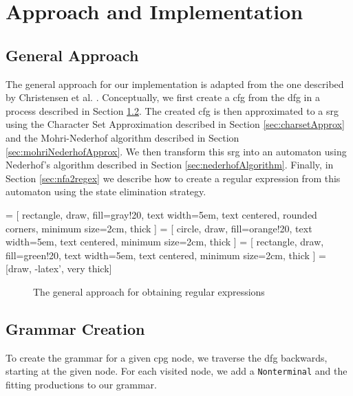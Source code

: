 \chapter{Approach and Implementation}
\label{chapter:Approach}


\section{General Approach}

The general approach for our implementation is adapted from the one described by Christensen et al. \cite{brics}. Conceptually, we first create a \acf{cfg} from the \ac{dfg} in a process described in Section \ref{sec:grammarCreation}.
The created \ac{cfg} is then approximated to a \acf{srg} using the Character Set Approximation described in Section \ref{sec:charsetApprox} and the Mohri-Nederhof algorithm described in Section \ref{sec:mohriNederhofApprox}. We then transform this \ac{srg} into an automaton using Nederhof's algorithm described in Section \ref{sec:nederhofAlgorithm}. Finally, in Section \ref{sec:nfa2regex} we describe how to create a regular expression from this automaton using the state elimination strategy.


 = [
	rectangle, 
	draw, 
	fill=gray!20, 
	text width=5em, 
	text centered, 
	rounded corners, 
	minimum size=2cm,
	thick
	]
 = [
	circle, 
	draw, 
	fill=orange!20, 
	text width=5em, 
	text centered,
	minimum size=2cm,
	thick
	]
 = [
	rectangle, 
	draw, 
	fill=green!20, 
	text width=5em, 
	text centered, 
	minimum size=2cm,
	thick
	]
 = [draw, -latex', very thick]
\begin{figure}[H]
	\centering
{}
\caption{The general approach for obtaining regular expressions}
\end{figure}
\label{fig:approach}

\section{Grammar Creation}\label{sec:grammarCreation}
To create the grammar for a given \ac{cpg} node, we traverse the \ac{dfg} backwards, starting at the given node. 
For each visited node, we add a \lstinline|Nonterminal| and the fitting productions to our grammar. 

